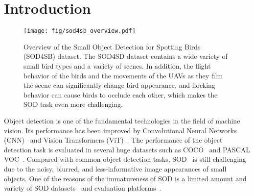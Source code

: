 \documentclass{mva_style}
\begin{document}
{\let\thefootnote\relax{}
}

\section{Introduction}

\begin{figure}[t]
  \begin{center}
    \texttt{[image: fig/sod4sb\_overview.pdf]}
  \end{center}
  \vspace{-2em}
  \caption{Overview of the Small Object Detection for Spotting Birds (SOD4SB) dataset. The SOD4SD dataset contains a wide variety of small bird types and a variety of scenes. In addition, the flight behavior of the birds and the movements of the UAVs as they film the scene can significantly change bird appearance, and flocking behavior can cause birds to occlude each other, which makes the SOD task even more challenging.}
  \label{fig:overview_sod4sb}
\end{figure}

Object detection is one of the fundamental technologies in the field of machine vision.
Its performance has been improved by Convolutional Neural Networks (CNN)~\cite{Faster_R-CNN_NIPS2015,yolo,duan2019centernet,tan2020efficientdet} and Vision Transformers (ViT)~\cite{detr,wang2023internimage,fang2023eva}.
The performance of the object detection task is evaluated in several huge datasets such as COCO~\cite{COCO_ECCV2014} and PASCAL VOC~\cite{everingham2010pascal}.
Compared with common object detection tasks, SOD~\cite{sod_survey1,sod_survey2,sod_survey3} is still challenging due to the noisy, blurred, and less-informative image appearances of small objects.
One of the reasons of the immatureness of SOD is a limited amount and variety of SOD datasets~\cite{wang2021tiny,yu2020scale,behrendt2017deep,waqas2019isaid,bosquet2018stdnet} and evaluation platforms~\cite{yu20201st,coluccia2021drone}.
\end{document}
